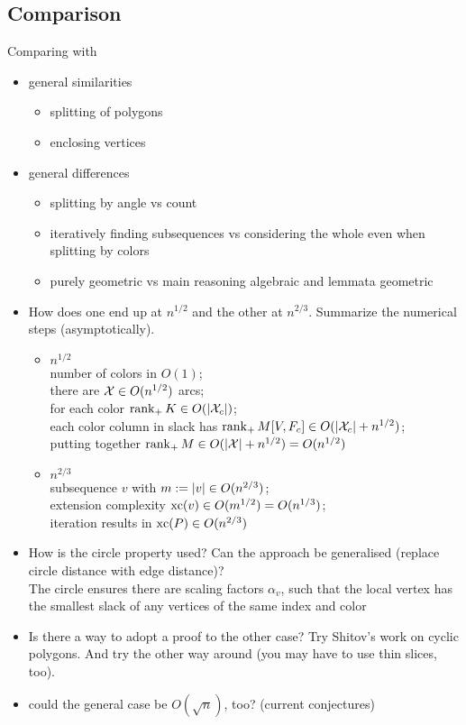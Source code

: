 \subsection{Comparison}
Comparing \cite{shitov2020sublinear} with \cite{kwan2020extension}

\begin{itemize}
  \item general similarities 
  \begin{itemize}
    \item splitting of polygons
    \item enclosing vertices
  \end{itemize}
  \item general differences 
  \begin{itemize}
    \item splitting by angle vs count
    \item iteratively finding subsequences vs considering the whole even when splitting by colors
    \item purely geometric vs main reasoning algebraic and lemmata geometric
  \end{itemize}
  \item How does one end up at $n^{1/2}$ and the other at $n^{2/3}$. Summarize the numerical steps (asymptotically).
  \begin{itemize}
    \item $n^{1/2}$\\ 
    number of colors in $O(1)$;\\
    there are $\mathcal{X} \in O(n^{1/2})$ arcs;\\
    for each color $\operatorname{rank}_+ K \in O(\lvert\mathcal{X}_c\rvert)$;\\
    each color column in slack has $\operatorname{rank}_+ M[V,F_c] \in O(\lvert\mathcal{X}_c\rvert + n^{1/2})$;\\
    putting together $\operatorname{rank}_+ M \in O(\lvert\mathcal{X}\rvert + n^{1/2}) = O(n^{1/2})$
    \item $n^{2/3}$\\
    subsequence $v$ with $m := \lvert v\rvert \in O(n^{2/3})$;\\
    extension complexity $\operatorname{xc}(v) \in O(m^{1/2}) = O(n^{1/3})$;\\
    iteration results in $\operatorname{xc}(P) \in O(n^{2/3})$
  \end{itemize}
  \item How is the circle property used? Can the approach be generalised (replace circle distance with edge distance)?\\
  The circle ensures there are scaling factors $\alpha_v$, such that the local vertex has the smallest slack of any vertices of the same index and color
  \item Is there a way to adopt a proof to the other case? Try Shitov's work on cyclic polygons. And try the other way around (you may have to use thin slices, too).
  \item could the general case be $O(\sqrt{n})$, too? (current conjectures)
\end{itemize}
